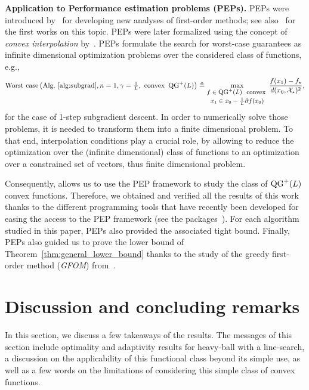         \textbf{Application to Performance estimation problems (PEPs).} PEPs were introduced by~\citet{drori2014performance} for developing new analyses of first-order methods; see also~\citep{ drori2014contributions, kim2016optimized} for the first works on this topic.
        PEPs were later formalized using the concept of \emph{convex interpolation} by~\citep{taylor2017smooth, taylor2017exact}.
        PEPs formulate the search for worst-case guarantees as infinite dimensional optimization problems over the considered class of functions, e.g.,
        \[
        \text{Worst case}\left(\text{Alg.}~\ref{alg:subgrad}, n=1, \gamma=\tfrac{1}{L}, \text{ convex } \QG^+(L)  \right) \triangleq \max_{\footnotesize\shortstack{$f\in \QG^+(L)$ \text{ convex } \\ $x_1 \in x_0 -\frac{1}{L} \partial f(x_0)$} } \frac{f(x_1) - f_\star}{ d(x_0,\mathcal X_\star)^2},
        \]
        for the case of 1-step subgradient descent.
        In order to numerically solve those problems, it is  needed to transform them into a finite dimensional problem.
        To that end, interpolation conditions play a crucial role, by allowing to reduce the optimization over the (infinite dimensional) class of functions to an optimization over a constrained set of vectors, thus finite dimensional problem.

        Consequently,  allows us to use the PEP framework to study the class of $\operatorname{QG}^+(L)$ convex functions.
        Therefore, we obtained and verified all the results of this work thanks to the different programming tools that have recently been developed for easing the access to the PEP framework (see the packages~\citep{taylor2017performance, goujaud2022pepit}).
        For each algorithm studied in this paper, PEPs also provided the associated tight bound.
        Finally, PEPs also guided us to prove the lower bound of Theorem~\ref{thm:general_lower_bound} thanks to the study of the greedy first-order method (\emph{GFOM}) from~\citep{drori2020efficient}.

    \vspace{-0.5em}

\section{Discussion and concluding remarks}
\label{sec:discussion_take_away}

    \vspace{-0.5em}
    In this section, we discuss a few takeaways of the results.
    The messages of this section include optimality and adaptivity results for heavy-ball with a line-search, a discussion on the applicability of this functional class beyond its simple use, as well as a few words on the limitations of considering this simple class of convex functions.

